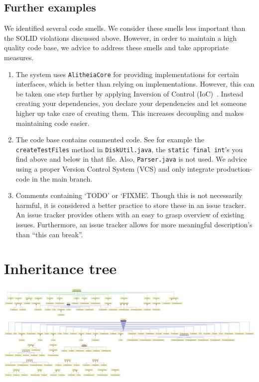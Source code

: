 \documentclass{article}
\begin{document}
\subsection{Further examples}
We identified several code smells. We consider these smells less important than the SOLID violations discussed above. However, in order to maintain a high quality code base, we advice to address these smells and take appropriate measures.

\begin{enumerate}
\item The system uses \verb|AlitheiaCore| for providing implementations for certain interfaces, which is better than relying on implementations. However, this can be taken one step further by applying Inversion of Control (IoC)~\cite{ioc}. Instead creating your dependencies, you declare your dependencies and let someone higher up take care of creating them. This increases decoupling and makes maintaining code easier.

\item The code base contains commented code. See for example the \verb|createTestFiles| method in \verb|DiskUtil.java|, the \verb|static final int|'s you find above and below in that file. Also, \verb|Parser.java| is not used. We advice using a proper Version Control System (VCS) and only integrate production-code in the main branch.

\item Comments containing `TODO' or `FIXME'. Though this is not necessarily harmful, it is considered a better practice to store these in an issue tracker. An issue tracker provides others with an easy to grasp overview of existing issues. Furthermore, an issue tracker allows for more meaningful description's than ``this can break''.
\end{enumerate}




\newpage
\appendix
\section{Inheritance tree} \label{app:inheritance}

\begin{sideways}
	\includegraphics[width=1.3\textwidth]{inheritance-diagram}
	\label{fig:inheritance}
\end{sideways}
\end{document}
